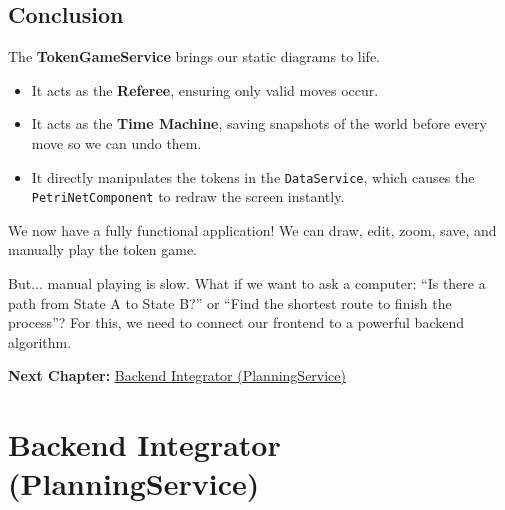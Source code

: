 \documentclass[a4paper,11pt,oneside]{report}
\begin{document}
\section{Conclusion}

The \textbf{TokenGameService} brings our static diagrams to life.
\begin{itemize}
    \item It acts as the \textbf{Referee}, ensuring only valid moves occur.
    \item It acts as the \textbf{Time Machine}, saving snapshots of the world before every move so we can undo them.
    \item It directly manipulates the tokens in the \texttt{DataService}, which causes the \texttt{PetriNetComponent} to redraw the screen instantly.
\end{itemize}

We now have a fully functional application! We can draw, edit, zoom, save, and manually play the token game.

But... manual playing is slow. What if we want to ask a computer: ``Is there a path from State A to State B?'' or ``Find the shortest route to finish the process''? For this, we need to connect our frontend to a powerful backend algorithm.

\textbf{Next Chapter:} \hyperref[chap:planning]{Backend Integrator (PlanningService)}

\chapter{Backend Integrator (PlanningService)}
\label{chap:planning}
\end{document}
